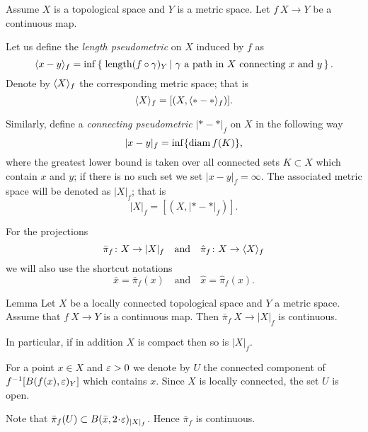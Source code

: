 \documentclass{article}
\begin{document}
Assume $X$ is a topological space and $Y$ is a metric space.
Let $f\:X\to Y$ be a continuous map. 

Let us define the \emph{length pseudometric} on $X$ induced by $f$ as
\[\< x-y\>_f
=
\inf
\set{\length(f\circ\gamma)_Y}{\gamma\ \text{a path in}\  X\ \text{connecting}\ x\ \text{and}\ y}.\]
Denote by $\langle X\rangle_f$ the corresponding metric space; that is 
\[\langle X\rangle_f=[(X,\langle{*}-{*}\rangle_f)].\] 

Similarly, define a \emph{connecting pseudometric} $|{*}-{*}|_f$ on $X$ in
the following way
\[|x-y|_f=\inf\{\mathop{\rm diam}\nolimits f(K)\},\]
where the greatest lower bound is taken over all connected sets $K\subset X$ which contain $x$ and $y$;
if there is no such set we set $|x-y|_f=\infty$. 
The associated metric space will be
denoted as $|X|_f$;
that is 
\[| X|_f=[(X,|{*}-{*}|_f)].\]

For the projections 
\[\bar \pi_f\colon X\to |X|_f\quad\text{and}\quad \hat \pi_f\colon X\to \langle X\rangle_f\]
we will also use the shortcut notations 
\[\bar x=\bar\pi_f(x) \quad\text{and}\quad  \hat x= \hat \pi_f(x).\]

\begin{thm}{Lemma}\label{lem:picont}
Let $X$ be a locally connected topological space and $Y$ a metric space. Assume that $f\:X\to Y$ is a continuous map. 
Then $\bar\pi_f\:X\to|X|_f$ is continuous.

In particular, if in addition $X$ is compact then so is $|X|_f$.
\end{thm}

For a point $x\in X$ and $\varepsilon>0$ we denote by $U$ the connected component of $f^{-1}[B(f(x),\varepsilon)_{Y}]$ which contains $x$.
Since $X$ is locally connected, the set $U$ is open.

Note that $\bar\pi_f(U)\subset B(\bar x,2\cdot \eps)_{|X|_f}$. Hence
$\bar\pi_f$ is continuous.
\qeds



\begin{wrapfigure}{r}{37 mm}
\end{wrapfigure}
\end{document}
